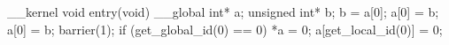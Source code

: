 __kernel void entry(void) {
  __global int* a;
  unsigned int* b;
  b = a[0];
  a[0] = b;
  a[0] = b;
  barrier(1);
  if (get_global_id(0) == 0) {
    *a = 0;
  }
  a[get_local_id(0)] = 0;
}
